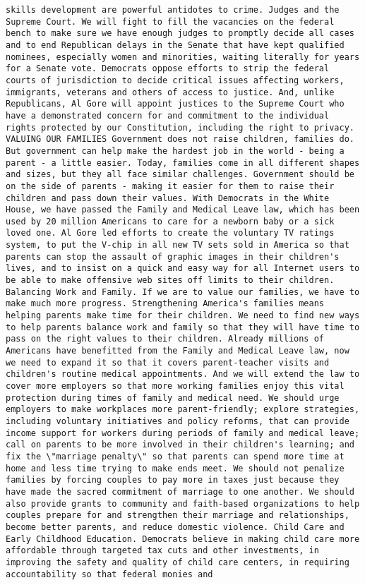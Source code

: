 \documentclass[
]{article}
\begin{document}
\begin{verbatim}
skills development are powerful antidotes to crime. Judges and the Supreme Court. We will fight to fill the vacancies on the federal bench to make sure we have enough judges to promptly decide all cases and to end Republican delays in the Senate that have kept qualified nominees, especially women and minorities, waiting literally for years for a Senate vote. Democrats oppose efforts to strip the federal courts of jurisdiction to decide critical issues affecting workers, immigrants, veterans and others of access to justice. And, unlike Republicans, Al Gore will appoint justices to the Supreme Court who have a demonstrated concern for and commitment to the individual rights protected by our Constitution, including the right to privacy. VALUING OUR FAMILIES Government does not raise children, families do. But government can help make the hardest job in the world - being a parent - a little easier. Today, families come in all different shapes and sizes, but they all face similar challenges. Government should be on the side of parents - making it easier for them to raise their children and pass down their values. With Democrats in the White House, we have passed the Family and Medical Leave law, which has been used by 20 million Americans to care for a newborn baby or a sick loved one. Al Gore led efforts to create the voluntary TV ratings system, to put the V-chip in all new TV sets sold in America so that parents can stop the assault of graphic images in their children's lives, and to insist on a quick and easy way for all Internet users to be able to make offensive web sites off limits to their children. Balancing Work and Family. If we are to value our families, we have to make much more progress. Strengthening America's families means helping parents make time for their children. We need to find new ways to help parents balance work and family so that they will have time to pass on the right values to their children. Already millions of Americans have benefitted from the Family and Medical Leave law, now we need to expand it so that it covers parent-teacher visits and children's routine medical appointments. And we will extend the law to cover more employers so that more working families enjoy this vital protection during times of family and medical need. We should urge employers to make workplaces more parent-friendly; explore strategies, including voluntary initiatives and policy reforms, that can provide income support for workers during periods of family and medical leave; call on parents to be more involved in their children's learning; and fix the \"marriage penalty\" so that parents can spend more time at home and less time trying to make ends meet. We should not penalize families by forcing couples to pay more in taxes just because they have made the sacred commitment of marriage to one another. We should also provide grants to community and faith-based organizations to help couples prepare for and strengthen their marriage and relationships, become better parents, and reduce domestic violence. Child Care and Early Childhood Education. Democrats believe in making child care more affordable through targeted tax cuts and other investments, in improving the safety and quality of child care centers, in requiring accountability so that federal monies and 
\end{verbatim}
\end{document}
